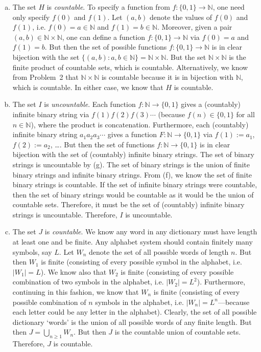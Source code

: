 \documentclass[11pt,letterpaper]{article}
\begin{document}
\begin{enumerate}[(a)]
\item The set $H$ is \textit{countable}. To specify a function from $f: \{ 0, 1 \} \to \mathbb{N}$, one need only specify $f(0)$ and $f(1)$. Let $(a, b)$ denote the values of $f(0)$ and $f(1)$, i.e. $f(0)= a \in \mathbb{N}$ and $f(1)= b \in \mathbb{N}$. Moreover, given a pair $(a, b) \in \mathbb{N} \times \mathbb{N}$, one can define a function $f: \{ 0, 1 \} \to \mathbb{N}$ via $f(0)= a$ and $f(1)= b$. But then the set of possible functions $f: \{ 0, 1 \} \to \mathbb{N}$ is in clear bijection with the set $\{ (a, b) \colon a, b \in \mathbb{N} \}= \mathbb{N} \times \mathbb{N}$. But the set $\mathbb{N} \times \mathbb{N}$ is the finite product of countable sets, which is countable. Alternatively, we know from Problem~2 that $\mathbb{N} \times \mathbb{N}$ is countable because it is in bijection with $\mathbb{N}$, which is countable. In either case, we know that $H$ is countable. 

\item The set $I$ is \textit{uncountable}. Each function $f: \mathbb{N} \to \{ 0, 1 \}$ gives a (countably) infinite binary string via $f(1)f(2)f(3)\cdots$ (because $f(n) \in \{ 0, 1 \}$ for all $n \in \mathbb{N}$), where the product is concatenation. Furthermore, each (countably) infinite binary string $a_1a_2a_3\cdots$ gives a function $F: \mathbb{N} \to \{ 0, 1 \}$ via $f(1):= a_1$, $f(2):= a_2$, \dots. But then the set of functions $f: \mathbb{N} \to \{ 0, 1 \}$ is in clear bijection with the set of (countably) infinite binary strings. The set of binary strings is uncountable by (g). The set of binary strings is the union of finite binary strings and infinite binary strings. From (f), we know the set of finite binary strings is countable. If the set of infinite binary strings were countable, then the set of binary strings would be countable as it would be the union of countable sets. Therefore, it must be the set of (countably) infinite binary strings is uncountable. Therefore, $I$ is uncountable. 

\item The set $J$ is \textit{countable}. We know any word in any dictionary must have length at least one and be finite. Any alphabet system should contain finitely many symbols, say $L$. Let $W_n$ denote the set of all possible words of length $n$. But then $W_1$ is finite (consisting of every possible symbol in the alphabet, i.e. $|W_1|= L$). We know also that $W_2$ is finite (consisting of every possible combination of two symbols in the alphabet, i.e. $|W_2|= L^2$). Furthermore, continuing in this fashion, we know that $W_n$ is finite (consisting of every possible combination of $n$ symbols in the alphabet, i.e. $|W_n|= L^n$---because each letter could be any letter in the alphabet). Clearly, the set of all possible dictionary `words' is the union of all possible words of any finite length. But then $J= \bigcup_{n \geq 1} W_n$. But then $J$ is the countable union of countable sets. Therefore, $J$ is countable. 


\end{enumerate}
\end{document}
